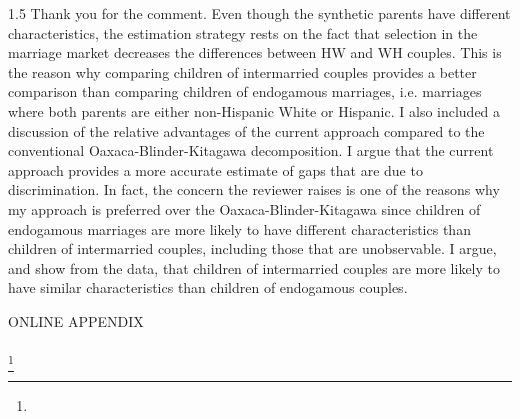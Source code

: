 \documentclass[12pt,english]{article}
\newcommand{\rrxspc}{1.5}
\begin{document}
        \begin{spacing}{\rrxspc}
            Thank you for the comment. Even though the synthetic parents have different characteristics, the estimation strategy rests on the fact that selection in the marriage market decreases the differences between HW and WH couples. This is the reason why comparing children of intermarried couples provides a better comparison than comparing children of endogamous marriages, i.e. marriages where both parents are either non-Hispanic White or Hispanic. I also included a discussion of the relative advantages of the current approach compared to the conventional Oaxaca-Blinder-Kitagawa decomposition. I argue that the current approach provides a more accurate estimate of gaps that are due to discrimination. In fact, the concern the reviewer raises is one of the reasons why my approach is preferred over the Oaxaca-Blinder-Kitagawa since children of endogamous marriages are more likely to have different characteristics than children of intermarried couples, including those that are unobservable. I argue, and show from the data, that children of intermarried couples are more likely to have similar characteristics than children of endogamous couples.
    \end{spacing}

\clearpage
\pagebreak
\begin{refsection}
\setcounter{section}{0}
\renewcommand{\thesection}{\Alph{section}}
\renewcommand{\thesubsection}{\Alph{section}.\arabic{subsection}}
\renewcommand{\thesubsubsection}{\Alph{section}.\arabic{subsection}.\arabic{subsubsection}}
\setcounter{page}{1}

\renewcommand*{\thefootnote}{\fnsymbol{footnote}}
\begingroup
\doublespacing
\centering
\Large ONLINE APPENDIX \\[1.5em]
\LARGE \PAPERTITLE \\[0.75em]
\large
\AUTHORHADAH\footnote[1]{\AUTHORHADAHINFO}\\[1.0em]
\endgroup
\clearpage



\newpage
\pagebreak

\begingroup
{}
\setlength\bibitemsep{0pt}
\printbibliography[title=References for Online Appendix]
\endgroup
\pagebreak
\end{refsection}
\end{document}
